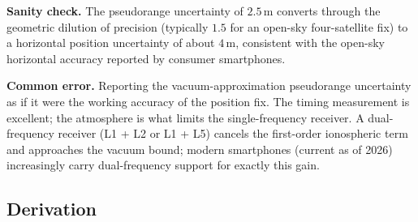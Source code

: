 \begin{exercise}
\textbf{Sanity check.} The pseudorange uncertainty of $2.5 \,\si
{\meter}$ converts through the geometric dilution of precision
(typically $1.5$ for an open-sky four-satellite fix) to a
horizontal position uncertainty of about $4 \,\si{\meter}$,
consistent with the open-sky horizontal accuracy reported by
consumer smartphones.

\textbf{Common error.} Reporting the vacuum-approximation
pseudorange uncertainty as if it were the working accuracy of the
position fix. The timing measurement is excellent; the
atmosphere is what limits the single-frequency receiver. A dual-
frequency receiver (L1 + L2 or L1 + L5) cancels the
first-order ionospheric term and approaches the vacuum bound;
modern smartphones (current as of 2026) increasingly carry
dual-frequency support for exactly this gain.
\end{exercise}

\subsection*{Derivation}

